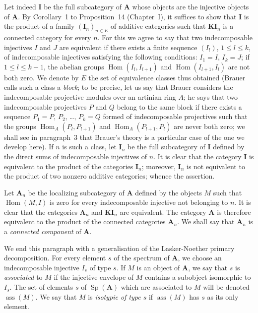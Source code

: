 Let indeed $\mathbf{I}$ be the full subcategory of $\mathbf{A}$ whose
objects are the injective objects of $\mathbf{A}$. By Corollary~1 to
Proposition~14 (Chapter~I), it suffices to show that $\mathbf{I}$ is
the product of a family $(\mathbf{I}_n)_{n\in E}$ of additive
categories such that $\mathbf{KI}_n$ is a connected category for every
$n$. For this we agree to say that two indecomposable injectives $I$
and $J$ are equivalent if there exists a finite sequence $(I_l)$,
$1 \le l \le k$, of indecomposable injectives satisfying the following
conditions: $I_1 = I$, $I_k = J$; if $1 \le l \le k-1$, the abelian
groups $\operatorname{Hom}(I_l, I_{l+1})$ and
$\operatorname{Hom}(I_{l+1}, I_l)$ are not both zero. We denote by $E$
the set of equivalence classes thus obtained (Brauer calls such a
class a \emph{block}; to be precise, let us say that Brauer considers
the indecomposable projective modules over an artinian ring $A$; he
says that two indecomposable projectives $P$ and $Q$ belong to the
same block if there exists a sequence $P_1 = P$, $P_2$, \dots,
$P_k = Q$ formed of indecomposable projectives such that the groups
$\operatorname{Hom}_A(P_l, P_{l+1})$ and
$\operatorname{Hom}_A(P_{l+1}, P_l)$ are never both zero; we shall see
in paragraph~3 that Brauer's theory is a particular case of the one
we develop here). If $n$ is such a class, let $\mathbf{I}_n$ be the
full subcategory of $\mathbf{I}$ defined by the direct sums of
indecomposable injectives of $n$. It is clear that the category
$\mathbf{I}$ is equivalent to the product of the categories
$\mathbf{I}_n$; moreover, $\mathbf{I}_n$ is not equivalent to the
product of two nonzero additive categories; whence the assertion.

Let $\mathbf{A}_n$ be the localizing subcategory of $\mathbf{A}$
defined by the objects $M$ such that $\operatorname{Hom}(M, I)$ is
zero for every indecomposable injective not belonging to $n$. It is
clear that the categories $\mathbf{A}_n$ and $\mathbf{KI}_n$ are
equivalent. The category $\mathbf{A}$ is therefore equivalent to the
product of the connected categories $\mathbf{A}_n$. We shall say that
$\mathbf{A}_n$ is a \emph{connected component} of $\mathbf{A}$.

We end this paragraph with a generalisation of the Lasker-Noether
primary decomposition. For every element $s$ of the spectrum of
$\mathbf{A}$, we choose an indecomposable injective $I_s$ of type $s$.
If $M$ is an object of $\mathbf{A}$, we say that $s$ is
\emph{associated} to $M$ if the injective envelope of $M$ contains a
subobject isomorphic to $I_s$. The set of elements $s$ of
$\operatorname{Sp}(\mathbf{A})$ which are associated to $M$ will be
denoted $\operatorname{ass}(M)$. We say that $M$ is \emph{isotypic of
type $s$} if $\operatorname{ass}(M)$ has $s$ as its only element.

